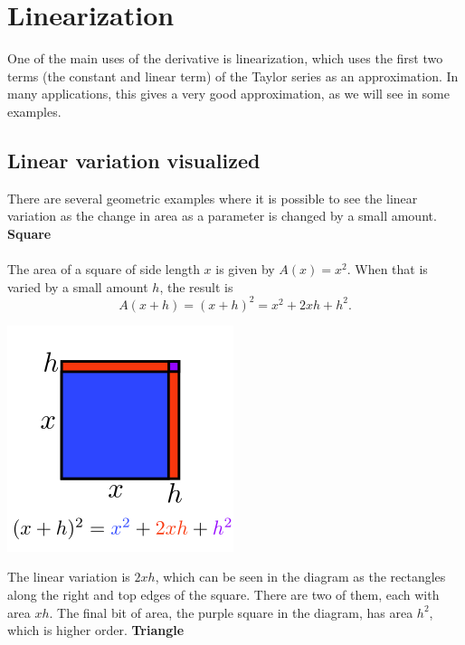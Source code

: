 \documentclass[twoside,openright,titlepage,a4paper]{book}
\begin{document}
\begin{sloppypar}
\begin{itemize}
\end{itemize}

\section{Linearization} \label{ChDifferentiationSecLinearization}
One of the main uses of the derivative is linearization, which uses the first two terms (the constant and linear term) of the Taylor series as an approximation. In many applications, this gives a very good approximation, as we will see in some examples.

\subsection{Linear variation visualized}
There are several geometric examples where it is possible to see the linear variation as the change in area as a parameter is changed by a small amount.
\bigbreak
\noindent \textbf{Square}\\\\

The area of a square of side length $x$ is given by $A(x) = x^2$. When that is varied by a small amount $h$, the result is \[ A(x+h) = (x+h)^2 = x^2+2xh+h^2. \]
\begin{center}\includegraphics[scale=0.6]{SquareVariation}\end{center}

The linear variation is $2xh$, which can be seen in the diagram as the rectangles along the right and top edges of the square. There are two of them, each with area $xh$. The final bit of area, the purple square in the diagram, has area $h^2$, which is higher order.
\bigbreak
\noindent \textbf{Triangle}\\\\


\end{sloppypar}
\end{document}
